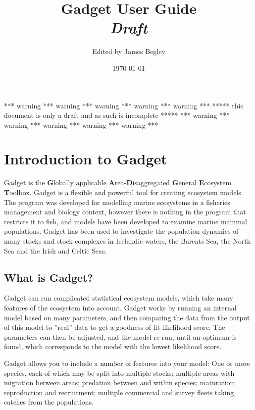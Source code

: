 \documentclass [a4paper, 10pt]{book}
\begin{document}
\title{\Huge{Gadget User Guide}\\ \huge{\textit{Draft}}}
\author{Edited by James Begley}
\date{\today}
\maketitle

\setlength{\parindent}{0pt}

\tableofcontents

\newpage
*** warning *** warning *** warning *** warning *** warning ***\newline
***** this document is only a draft and as such is incomplete *****\newline
*** warning *** warning *** warning *** warning *** warning ***\newline

\newpage
{}

\chapter{Introduction to Gadget}\label{chap:intro}
Gadget is the {\bf G}lobally applicable {\bf A}rea-{\bf D}isaggregated {\bf G}eneral {\bf E}cosystem {\bf T}oolbox.  Gadget is a flexible and powerful tool for creating ecosystem models.  The program was developed for modelling marine ecosystems in a fisheries management and biology context, however there is nothing in the program that restricts it to fish, and models have been developed to examine marine mammal populations.  Gadget has been used to investigate the population dynamics of many stocks and stock complexes in Icelandic waters, the Barents Sea, the North Sea and the Irish and Celtic Seas.

\section{What is Gadget?}\label{sec:whatisgadget}
Gadget can run complicated statistical ecosystem models, which take many features of the ecosystem into account. Gadget works by running an internal model based on many parameters, and then comparing the data from the output of this model to ''real'' data to get a goodness-of-fit likelihood score.  The parameters can then be adjusted, and the model re-run, until an optimum is found, which corresponds to the model with the lowest likelihood score.

\bigskip
Gadget allows you to include a number of features into your model: One or more species, each of which may be split into multiple stocks; multiple areas with migration between areas; predation between and within species; maturation; reproduction and recruitment; multiple commercial and survey fleets taking catches from the populations.
\end{document}
